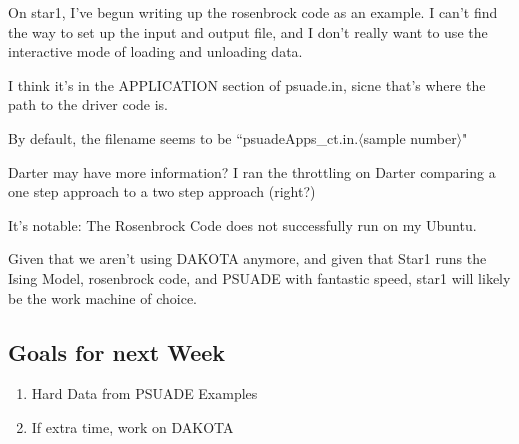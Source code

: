 \documentclass[11pt]{article} %
\begin{document}
On star1, I've begun writing up the rosenbrock code as an example. I can't find the way to set up the input and output file, and I don't really want to use the interactive mode of loading and unloading data.

I think it's in the APPLICATION section of psuade.in, sicne that's where the path to the driver code is.

By default, the filename seems to be ``psuadeApps\_ct.in.$\langle$sample number$\rangle$"

Darter may have more information? I ran the throttling on Darter comparing a one step approach to a two step approach (right?)

It's notable: The Rosenbrock Code does not successfully run on my Ubuntu.

Given that we aren't using DAKOTA anymore, and given that Star1 runs the Ising Model, rosenbrock code, and PSUADE with fantastic speed, star1 will likely be the work machine of choice.

\subsection{Goals for next Week}
\begin{enumerate}
\item Hard Data from PSUADE Examples
\item If extra time, work on DAKOTA
\end{enumerate}
\end{document}
